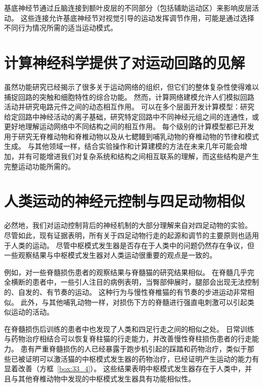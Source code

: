 基底神经节通过丘脑连接到额叶皮层的不同部分（包括辅助运动区）来影响皮层活动。
这些连接允许基底神经节对视觉引导的运动发挥调节作用，可能是通过选择不同行为情况所需的适当运动模式。



\section{计算神经科学提供了对运动回路的见解}

虽然功能研究已经揭示了很多关于运动网络的组织，但它们的整体复杂性使得难以捕捉回路的突触和细胞特性的综合功能。
然而，计算网络建模允许人们模拟回路活动并研究电路元件之间的动态相互作用。
可以在多个层面开发计算模型：研究给定回路中神经活动的离子基础，研究特定回路中不同神经元组之间的连通性，或更好地理解运动网络中不同结构之间的相互作用。
每个级别的计算模型都已开发用于研究无脊椎动物和脊椎动物以及从七鳃鳗到哺乳动物的脊椎动物的节律和模式生成。
与其他领域一样，结合实验操作和计算建模的方法在未来几年可能会增加，并有可能增进我们对复杂系统和结构之间相互联系的理解，而这些结构是产生完整运动功能所需的。


\section{人类运动的神经元控制与四足动物相似}

必然地，我们对运动控制背后的神经机制的大部分理解来自对四足动物的实验。
尽管如此，现有证据表明，所有关于四足动物行走的起源和调节的主要原则也适用于人类的运动。
尽管中枢模式发生器是否存在于人类中的问题仍然存在争议，但一些观察结果与中枢模式发生器对人类运动很重要的观点是一致的。


例如，对一些脊髓损伤患者的观察结果与脊髓猫的研究结果相似。
在脊髓几乎完全横断的患者中，一些引人注目的病例表明，当臀部伸展时，腿部会出现无法控制的、自发的、有节奏的运动。
这种行为与慢性脊椎猫的有节奏的步进运动非常相似。
此外，与其他哺乳动物一样，对损伤下方的脊髓进行强直电刺激可以引起类似运动的活动。


在脊髓损伤后训练的患者中也发现了人类和四足行走之间的相似之处。
日常训练与药物治疗相结合可以恢复脊柱猫的行走能力，并改善慢性脊柱损伤患者的行走能力。
患有严重脊髓损伤的人已经暴露于跑步机引起的踩踏和药物治疗，类似于那些已被证明可以激活猫的中枢模式发生器的药物治疗，已经证明产生运动的能力有显着改善（方框~\ref{box:33_4}）。
这些结果表明中枢模式发生器存在于人类中，并且与其他脊椎动物中发现的中枢模式发生器具有功能相似性。



